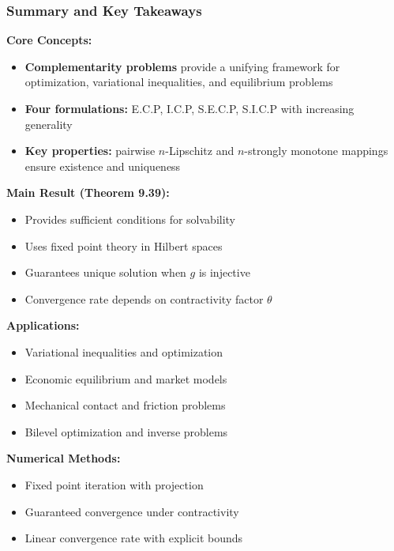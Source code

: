 \documentclass[aspectratio=169,10pt]{beamer}
\begin{document}
\begin{frame}
\frametitle{Summary and Key Takeaways}

\textbf{Core Concepts:}
\begin{itemize}
    \item \textbf{Complementarity problems} provide a unifying framework for
    optimization, variational inequalities, and equilibrium problems

    \item \textbf{Four formulations:} E.C.P, I.C.P, S.E.C.P, S.I.C.P with increasing generality

    \item \textbf{Key properties:} pairwise $n$-Lipschitz and $n$-strongly monotone mappings
    ensure existence and uniqueness
\end{itemize}

\vspace{0.3cm}

\textbf{Main Result (Theorem 9.39):}
\begin{itemize}
    \item Provides sufficient conditions for solvability
    \item Uses fixed point theory in Hilbert spaces
    \item Guarantees unique solution when $g$ is injective
    \item Convergence rate depends on contractivity factor $\theta$
\end{itemize}

\vspace{0.3cm}

\textbf{Applications:}
\begin{itemize}
    \item Variational inequalities and optimization
    \item Economic equilibrium and market models
    \item Mechanical contact and friction problems
    \item Bilevel optimization and inverse problems
\end{itemize}

\vspace{0.3cm}

\textbf{Numerical Methods:}
\begin{itemize}
    \item Fixed point iteration with projection
    \item Guaranteed convergence under contractivity
    \item Linear convergence rate with explicit bounds
\end{itemize}

\end{frame}
\end{document}
